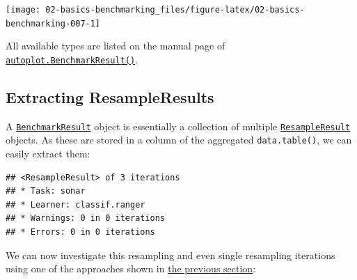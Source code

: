 \documentclass[]{scrbook}
\newenvironment{Shaded}{\begin{snugshade}}{\end{snugshade}}
\newcommand{\DecValTok}[1]{\textcolor[rgb]{0.00,0.00,0.81}{#1}}
\newcommand{\KeywordTok}[1]{\textcolor[rgb]{0.13,0.29,0.53}{\textbf{#1}}}
\newcommand{\NormalTok}[1]{#1}
\newcommand{\OperatorTok}[1]{\textcolor[rgb]{0.81,0.36,0.00}{\textbf{#1}}}
\newcommand{\StringTok}[1]{\textcolor[rgb]{0.31,0.60,0.02}{#1}}
\renewenvironment{Shaded} {\begin{snugshade}\small} {\end{snugshade}}
\begin{document}
\begin{center}\texttt{[image: 02-basics-benchmarking\_files/figure-latex/02-basics-benchmarking-007-1]} \end{center}

All available types are listed on the manual page of \href{https://mlr3viz.mlr-org.com/reference/autoplot.BenchmarkResult.html}{\texttt{autoplot.BenchmarkResult()}}.

\hypertarget{bm-resamp}{%
\subsection{Extracting ResampleResults}\label{bm-resamp}}

A \href{https://mlr3.mlr-org.com/reference/BenchmarkResult.html}{\texttt{BenchmarkResult}} object is essentially a collection of multiple \href{https://mlr3.mlr-org.com/reference/ResampleResult.html}{\texttt{ResampleResult}} objects.
As these are stored in a column of the aggregated \texttt{data.table()}, we can easily extract them:

\begin{Shaded}
\end{Shaded}

\begin{verbatim}
## <ResampleResult> of 3 iterations
## * Task: sonar
## * Learner: classif.ranger
## * Warnings: 0 in 0 iterations
## * Errors: 0 in 0 iterations
\end{verbatim}

We can now investigate this resampling and even single resampling iterations using one of the approaches shown in \protect\hyperlink{bm-exec}{the previous section}:

\begin{Shaded}
\end{Shaded}
\end{document}
